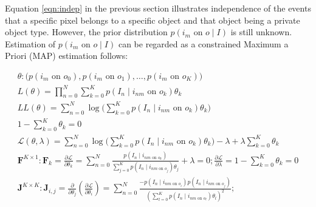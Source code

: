 \documentclass[11pt]{article}
\begin{document}
Equation \ref{eqn:indep} in the previous section illustrates independence of the events that a specific pixel belongs to a specific object and that object being a private object type.  However, the prior distribution $p(i_m \textrm{ on } o \mid I)$ is still unknown.  Estimation of $p(i_m \textrm{ on } o \mid I)$ can be regarded as a constrained Maximum a Priori (MAP) estimation follows:

\begin{gather}
	\theta : \Big(p(i_m \textrm{ on } o_0), p(i_m \textrm{ on } o_1),
		\dots, p(i_m \textrm{ on } o_K)\Big) \\
	L(\theta) = \prod_{n=0}^{N} \sum_{k=0}^{K} p(I_n \mid i_{nm} 
		\textrm{ on } o_k) \theta_k \\
	LL(\theta) = \sum_{n=0}^{N} \log \Big( \sum_{k=0}^{K} 
		p(I_n \mid i_{nm} \textrm{ on } o_k) \theta_k \Big) \label{eqn:loglik}\\
	1 - \sum_{k=0}^{K} \theta_k = 0 \label{eqn:constr}\\
	\mathcal{L}(\theta, \lambda) = \sum_{n=0}^{N} \log 
		\Big( \sum_{k=0}^{K} p(I_n \mid i_{nm} \textrm{ on } o_k) \theta_k \Big) - \lambda + \lambda \sum_{k=0}^{K} \theta_k \label{eqn:lagr}\\
	\mathbf{F}^{K \times 1}: \mathbf{F}_k = \frac{\partial \mathcal{L}}{\partial \theta_k} = 
		\sum_{n=0}^{N} \frac
			{p(I_n \mid i_{nm \textrm{ on } o_k})}
			{\sum_{j=0}^{K} p(I_n \mid i_{nm \textrm{ on } o_j}) \theta_j} 
			    + \lambda = 0;
		\frac{\partial \mathcal{L}}{\partial \lambda} = 1 - \sum_{k=0}^{K} 
			\theta_k = 0 \label{eqn:lagr1der}\\
	\mathbf{J}^{K \times K}: \mathbf{J}_{i,j} = \frac{\partial}{\partial \theta_j}     \left( \frac
		    {\partial \mathcal{L}}{\partial \theta_i} \right) = 
		\sum_{n=0}^{N} \frac
			{-p(I_n \mid i_{nm \textrm{ on } o_i})p(I_n \mid i_{nm 
			    \textrm{ on } o_j})}
			{(\sum_{l=0}^{K} p(I_n \mid i_{nm \textrm{ on } o_l}) \theta_l)^2} \label{eqn:lagr2der};
\end{gather}
\end{document}
